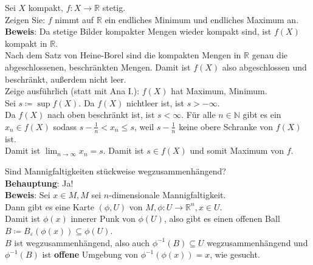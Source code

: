 \begin{problem}[3]
  Sei \( X \) kompakt, \( f: X \to \mathbb{R} \) stetig. \\
  Zeigen Sie: \( f \) nimmt auf \( \mathbb{R} \) ein endliches Minimum und endliches Maximum an. \\
  \textbf{Beweis}: Da stetige Bilder kompakter Mengen wieder kompakt sind, ist \( f(X) \) kompakt in \( \mathbb{R} \). \\
  Nach dem Satz von Heine-Borel sind die kompakten Mengen in \( \mathbb{R} \) genau die abgeschlossenen, beschränkten Mengen. Damit ist \( f(X) \) also abgeschlossen und beschränkt, außerdem nicht leer. \\
  Zeige ausführlich (statt mit Ana I.): \( f(X) \) hat Maximum, Minimum. \\
  Sei \( s \coloneqq \sup f(X) \). Da \( f(X) \) nichtleer ist, ist \( s > - \infty \). \\
  Da \( f(X) \) nach oben beschränkt ist, ist \( s < \infty \).
  Für alle \( n \in \mathbb{N} \) gibt es ein \( x_n \in f(X) \) sodass \( s - \frac{1}{n} < x_n \leq s \), weil \( s - \frac{1}{n} \) keine obere Schranke von \( f(X) \) ist. \\
  Damit ist \( \lim_{n \rightarrow \infty} x_n = s \). Damit ist \( s \in f(X) \) und somit Maximum von \( f \). \\
\end{problem}

\begin{problem}[4a]
  Sind Mannigfaltigkeiten stückweise wegzusammenhängend? \\
  \textbf{Behauptung}: Ja! \\
  \textbf{Beweis}: Sei \( x \in M, M \) sei \( n \)-dimensionale Mannigfaltigkeit. \\
  Dann gibt es eine Karte \( (\phi, U) \) von \( M, \phi: U \to \mathbb{R}^n, x \in U \). \\
  Damit ist \( \phi(x) \) innerer Punk von \( \phi(U) \), also gibt es einen offenen Ball \\ \( B \coloneqq B_\varepsilon(\phi(x)) \subseteq \phi(U) \). \\
  \( B \) ist wegzusammenhängend, also auch \( \phi^{-1}(B) \subseteq U \) wegzusammenhängend und \( \phi^{-1}(B) \) ist \textbf{offene} Umgebung von \( \phi^{-1}(\phi(x)) = x \), wie gesucht.
\end{problem}

